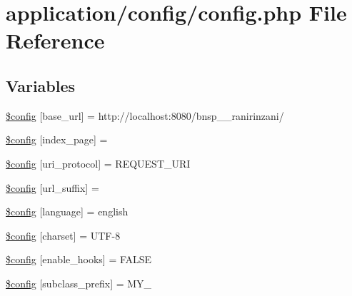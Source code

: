 \hypertarget{application_2config_2config_8php}{}\section{application/config/config.php File Reference}
\label{application_2config_2config_8php}
\subsection*{Variables}
\begin{DoxyCompactItemize}
\item 
\mbox{\hyperlink{application_2config_2config_8php_ab7d3dc1aba181a1198e7f26609046673}{\$config}} \mbox{[}\textquotesingle{}base\+\_\+url\textquotesingle{}\mbox{]} = \textquotesingle{}http\+://localhost\+:8080/bnsp\+\_\+\_\+ranirinzani/\textquotesingle{}
\item 
\mbox{\hyperlink{application_2config_2config_8php_a58f062e2a0bc777dad9a430970a7e50b}{\$config}} \mbox{[}\textquotesingle{}index\+\_\+page\textquotesingle{}\mbox{]} = \textquotesingle{}\textquotesingle{}
\item 
\mbox{\hyperlink{application_2config_2config_8php_a7e0a80976b25629e97a7c93f1d278d99}{\$config}} \mbox{[}\textquotesingle{}uri\+\_\+protocol\textquotesingle{}\mbox{]} = \textquotesingle{}R\+E\+Q\+U\+E\+S\+T\+\_\+\+U\+RI\textquotesingle{}
\item 
\mbox{\hyperlink{application_2config_2config_8php_ad1183c73fa84c832075d7220c49dc6b2}{\$config}} \mbox{[}\textquotesingle{}url\+\_\+suffix\textquotesingle{}\mbox{]} = \textquotesingle{}\textquotesingle{}
\item 
\mbox{\hyperlink{application_2config_2config_8php_a36e8d14df9a48c1e0945975109946e8b}{\$config}} \mbox{[}\textquotesingle{}language\textquotesingle{}\mbox{]} = \textquotesingle{}english\textquotesingle{}
\item 
\mbox{\hyperlink{application_2config_2config_8php_a071d6716931a0a13a16629257e9ef345}{\$config}} \mbox{[}\textquotesingle{}charset\textquotesingle{}\mbox{]} = \textquotesingle{}U\+TF-\/8\textquotesingle{}
\item 
\mbox{\hyperlink{application_2config_2config_8php_ae152db70ca5fa75e4b1cea6ac02116de}{\$config}} \mbox{[}\textquotesingle{}enable\+\_\+hooks\textquotesingle{}\mbox{]} = F\+A\+L\+SE
\item 
\mbox{\hyperlink{application_2config_2config_8php_a815be6a457c426ff84d3a1c589c6853e}{\$config}} \mbox{[}\textquotesingle{}subclass\+\_\+prefix\textquotesingle{}\mbox{]} = \textquotesingle{}M\+Y\+\_\+\textquotesingle{}

\end{DoxyCompactItemize}
